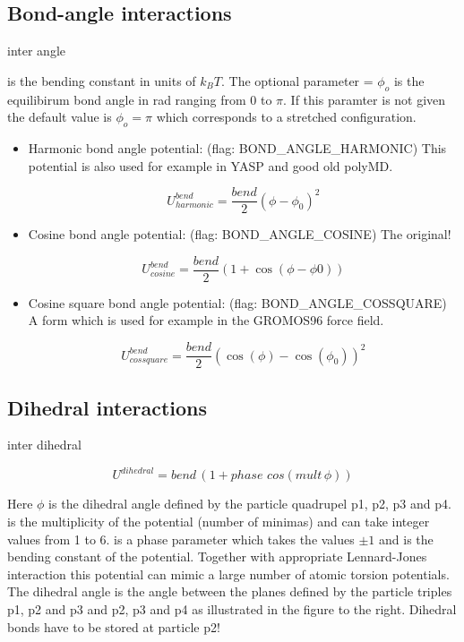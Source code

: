 \subsection{Bond-angle interactions}

\begin{essyntax}
  inter 
  angle  
\end{essyntax}

 is the bending constant in units of $k_BT$. The optional
parameter  = $ \phi_o $ is the equilibirum bond angle in rad
ranging from 0 to $ \pi $. If this paramter is not given the default
value is $ \phi_o = \pi $ which corresponds to a stretched
configuration.

\begin{itemize}
\item Harmonic bond angle potential: (flag: BOND_ANGLE_HARMONIC)
  This potential is also used for example in YASP and good old polyMD.

      \[ U^{bend}_{harmonic} = \frac{bend}{2} (\phi - \phi_0)^2 \]

    \item Cosine bond angle potential: (flag: BOND_ANGLE_COSINE) The
      \es{} original!

      \[ U^{bend}_{cosine} = \frac{bend}{2} (1 + \cos(\phi - \phi0)) \]

    \item Cosine square bond angle potential: (flag:
      BOND_ANGLE_COSSQUARE) A form which is used for example in the
      GROMOS96 force field.

      \[ U^{bend}_{cossquare} = \frac{bend}{2} (\cos(\phi) - \cos(\phi_0))^2 \]
\end{itemize}

\subsection{Dihedral interactions}

\begin{essyntax}
  inter 
  dihedral   
\end{essyntax}

\[ U^{dihedral} = bend \, (1 + phase \, \, cos(mult \, \phi)) \]

Here $\phi$ is the dihedral angle defined by the particle quadrupel
p1, p2, p3 and p4.  is the multiplicity of the potential
(number of minimas) and can take integer values from 1 to 6.
 is a phase parameter which takes the values $\pm1$ and
 is the bending constant of the potential. Together with
appropriate Lennard-Jones interaction this potential can mimic a large
number of atomic torsion potentials. The dihedral angle is the angle
between the planes defined by the particle triples p1, p2 and p3 and
p2, p3 and p4 as illustrated in the figure to the right. Dihedral
bonds have to be stored at particle p2!

